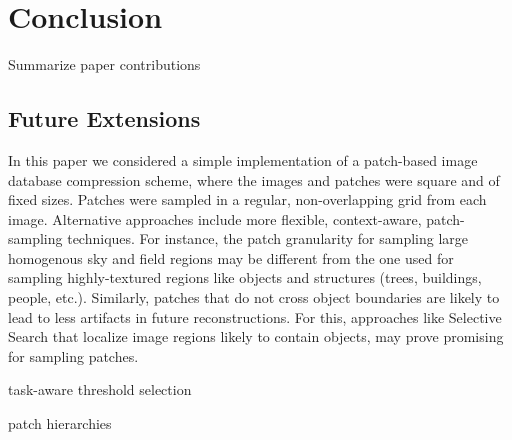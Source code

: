 \section{Conclusion}

\begin{edit}
Summarize paper contributions
\end{edit}





\subsection{Future Extensions}
\label{sec:futureext}

In this paper we considered a simple implementation of a patch-based image database compression scheme, where the images and patches were square and of fixed sizes. Patches were sampled in a regular, non-overlapping grid from each image.  Alternative approaches include more flexible, context-aware, patch-sampling techniques. For instance, the patch granularity for sampling large homogenous sky and field regions may be different from the one used for sampling highly-textured regions like objects and structures (trees, buildings, people, etc.). Similarly, patches that do not cross object boundaries are likely to lead to less artifacts in future reconstructions. For this, approaches like Selective Search \cite{UijlingsIJCV2013} that localize image regions likely to contain objects, may prove promising for sampling patches.

\begin{edit}

task-aware threshold selection

patch hierarchies
\end{edit}
